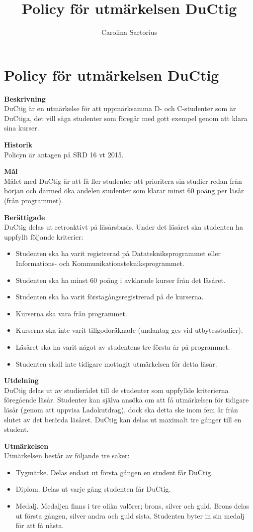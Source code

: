 \documentclass{dsekkallelse}
\title{Policy för utmärkelsen DuCtig}
\author{Carolina Sartorius}
\begin{document}
\section{Policy för utmärkelsen DuCtig}

\textbf{Beskrivning}\\
DuCtig är en utmärkelse för att uppmärksamma D- och C-studenter som är DuCtiga, det vill
säga studenter som föregår med gott exempel genom att klara sina kurser.

\textbf{Historik}\\
Policyn är antagen på SRD 16 vt 2015. 

\textbf{Mål}\\
Målet med DuCtig är att få fler studenter att prioritera sin studier redan från början och därmed
öka andelen studenter som klarar minst 60 poäng per läsår (från programmet).

\textbf{Berättigade}\\
DuCtig delas ut retroaktivt på läsårsbasis. Under det läsåret ska studenten ha uppfyllt följande
kriterier:

\begin{itemize}
	\item Studenten ska ha varit registrerad på Datatekniksprogrammet eller Informations- och
Kommunikationstekniksprogrammet.
\item Studenten ska ha minst 60 poäng i avklarade kurser från det läsåret.
\item Studenten ska ha varit förstagångsregistrerad på de kurserna.
\item Kurserna ska vara från programmet.
\item Kurserna ska inte varit tillgodoräknade (undantag ges vid utbytesstudier).
\item Läsåret ska ha varit något av studentens tre första år på programmet.
\item Studenten skall inte tidigare mottagit utmärkelsen för detta läsår.
\end{itemize}


\textbf{Utdelning}\\
DuCtig delas ut av studierådet till de studenter som uppfyllde kriterierna föregående läsår. Studenter kan själva ansöka om att få utmärkelsen för tidigare läsår (genom att uppvisa Ladokutdrag), dock ska detta ske inom fem år från slutet av det berörda läsåret. DuCtig kan delas ut
maximalt tre gånger till en student.

\textbf{Utmärkelsen}\\
Utmärkelsen består av följande tre saker:
\begin{itemize}
	\item Tygmärke. Delas endast ut första gången en student får DuCtig.
	\item Diplom. Delas ut varje gång studenten får DuCtig.
	\item Medalj. Medaljen finns i tre olika valörer; brons, silver och guld. Brons delas ut första
gången, silver andra och guld sista. Studenten byter in sin medalj för att få nästa. 
\end{itemize}
\end{document}
